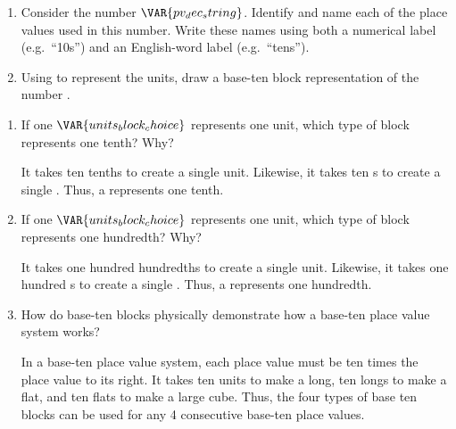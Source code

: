 
\begin{enumerate}
    \item Consider the number $\VAR{pv_dec_string}$. Identify and name each of the place values used in this number. Write these names using both a numerical label (e.g.\ ``10s'') and an English-word label (e.g.\ ``tens'').

    \vspace{20pt}
    \begin{ansenv}
    \end{ansenv}
    \vfill

    \item Using  to represent the units, draw a base-ten block representation of the number .

    \vspace{20pt}
    \begin{ansenv}
    \end{ansenv}
    \vfill
\end{enumerate}

\newpage


\begin{enumerate}
    \item If one $\VAR{units_block_choice}$ represents one unit, which type of block represents one tenth? Why?

    \vspace{20pt}
    \begin{ansenv}
        It takes ten tenths to create a single unit. Likewise, it takes ten s to create a single . Thus, a  represents one tenth.
    \end{ansenv}
    \vfill

    \item If one $\VAR{units_block_choice}$ represents one unit, which type of block represents one hundredth? Why?

    \vspace{20pt}
    \begin{ansenv}
        It takes one hundred hundredths to create a single unit. Likewise, it takes one hundred s to create a single . Thus, a  represents one hundredth. 
    \end{ansenv}
    \vfill

    \item How do base-ten blocks physically demonstrate how a base-ten place value system works?

    \vspace{20pt}
    \begin{ansenv}
        In a base-ten place value system, each place value must be ten times the place value to its right. It takes ten units to make a long, ten longs to make a flat, and ten flats to make a large cube. Thus, the four types of base ten blocks can be used for any 4 consecutive base-ten place values.
    \end{ansenv}
    \vfill

\end{enumerate}
